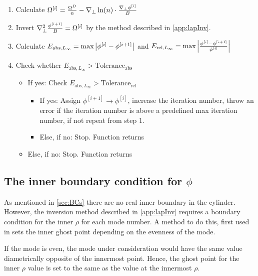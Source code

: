 \begin{algorithm}
\begin{enumerate}
    \item Calculate
        $ \Omega^{[i]} = \frac{\Omega^D}{n} -
        \nabla_\perp \ln(n) \cdot\frac{\nabla_\perp\phi^{[i]}}{B}
        $
    \item Invert $\nabla_\perp^2 \frac{\phi^{[i+1]}}{B} = \Omega^{[i]}$ by the method
        described in \cref{app:lapInv}.
    \item Calculate
        $E_{\text{abs}, L_\infty} = \text{max} \left|\phi^{[i]} - \phi^{[i+1]}\right|$
        and
        $E_{\text{rel}, L_\infty} = \text{max} \left|\frac{\phi^{[i]} - \phi^{[i+1]}}{\phi^{[i]}}\right|$
    \item Check whether $E_{\text{abs}, L_\infty} > \text{Tolerance}_\text{abs}$
    \begin{itemize}[noitemsep,nolistsep]
        \item If yes: Check $E_{\text{abs}, L_\infty} > \text{Tolerance}_\text{rel}$
            \begin{itemize}[noitemsep,nolistsep]
                \item If yes: Assign $\phi^{[i+1]} \to \phi^{[i]}$, increase the
                    iteration number, throw an error if the iteration number is
                    above a predefined max iteration number, if not repeat from
                    step 1.
                \item Else, if no: Stop. Function returns
            \end{itemize}
        \item Else, if no: Stop. Function returns
    \end{itemize}
\end{enumerate}
\end{algorithm}

\subsection{The inner boundary condition for \texorpdfstring{$\phi$}{the potential}}
\label{sec:innerPhiBC}
%
As mentioned in \cref{sec:BCs} there are no real inner boundary in the cylinder.
However, the inversion method described in \cref{app:lapInv} requires a boundary condition for the inner $\rho$ for each mode number.
A method to do this, first used in \cite{Naulin2008} sets the inner ghost point depending on the evenness of the mode.

If the mode is even, the mode under consideration would have the same value diametrically opposite of the innermost point.
Hence, the ghost point for the inner $\rho$ value is set to the same as the value at the innermost $\rho$.

